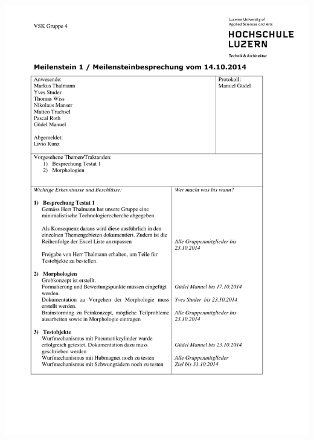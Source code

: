   	 
  	 \includegraphics[page=1,width=\textwidth]{Enddokumentation/Anhang/Extern/Besprechung_MS1.pdf}
  	 \newpage
